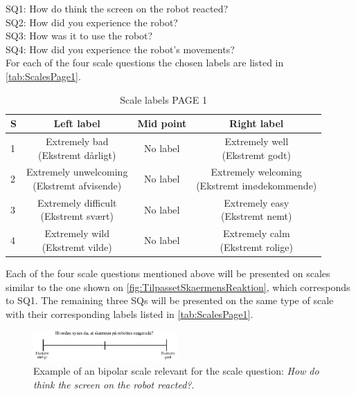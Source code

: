 \noindent
SQ1: How do think the screen on the robot reacted? \\%
SQ2: How did you experience the robot? \\ %
SQ3: How was it to use the robot?\\%
SQ4: How did you experience the robot's movements? \\%
For each of the four scale questions the chosen labels are listed in \autoref{tab:ScalesPage1}.
%
\begin{table}[H]
	\centering
\caption{Scale labels PAGE 1}
	\label{tab:ScalesPage1} 
	\begin{tabular}{l|c|c|c}
		S     & Left label & Mid point & Right label \\\hline
		1   & \makecell{Extremely bad\\(Ekstremt dårligt)}  & No label & \makecell{Extremely well \\(Ekstremt godt)}        \\\hline
		2   & \makecell{Extremely unwelcoming \\(Ekstremt afvisende)} & No label & \makecell{Extremely welcoming \\(Ekstremt imødekommende)}         \\\hline
		3   & \makecell{Extremely difficult \\(Ekstremt svært)} & No label & \makecell{Extremely easy \\(Ekstremt nemt)}         \\\hline
	 	4   & \makecell{Extremely wild \\(Ekstremt vilde)} & No label & \makecell{Extremely calm \\(Ekstremt rolige)}               
	\end{tabular}        
\end{table}
\noindent
%
Each of the four scale questions mentioned above will be presented on scales similar to the one shown on \autoref{fig:TilpassetSkaermensReaktion}, which corresponds to SQ1. The remaining three SQs will be presented on the same type of scale with their corresponding labels listed in \autoref{tab:ScalesPage1}.  
%
\begin{figure}[H]
\centering
\includegraphics[width = 0.49\textwidth]{Figure/TilpassetSkaermensReaktion}
\setlength{} 
\caption{Example of an bipolar scale relevant for the scale question: \textit{How do think the screen on the robot reacted?}.}
\label{fig:TilpassetSkaermensReaktion}
\end{figure}
